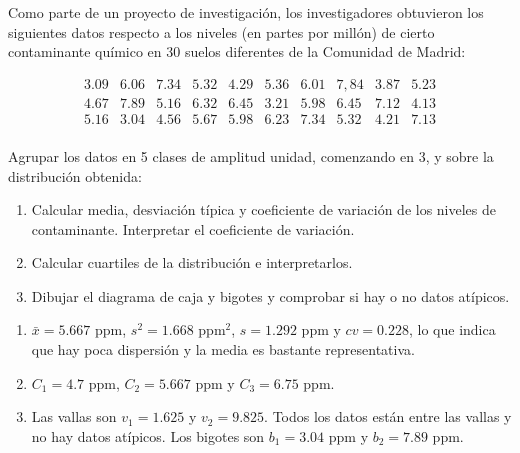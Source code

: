 {Como parte de un proyecto de investigación, los investigadores obtuvieron los siguientes datos respecto a los niveles (en partes por millón) de cierto contaminante químico en 30 suelos diferentes de la Comunidad de Madrid:
\begin{center}
\[
\begin{array}{cccccccccc}
3.09 & 6.06 & 7.34 & 5.32 & 4.29 & 5.36 & 6.01 & 7,84 & 3.87 & 5.23 \\
4.67 & 7.89 & 5.16 & 6.32 & 6.45 & 3.21 & 5.98 & 6.45 & 7.12 & 4.13 \\
5.16 & 3.04 & 4.56 & 5.67 & 5.98 & 6.23 & 7.34 & 5.32 & 4.21 & 7.13 \\
\end{array}
\]
\end{center}
Agrupar los datos en 5 clases de amplitud unidad, comenzando en 3, y sobre la distribución obtenida:
\begin{enumerate}
\item Calcular media, desviación típica y coeficiente de variación de los niveles de contaminante.
Interpretar el coeficiente de variación.
\item Calcular cuartiles de la distribución e interpretarlos.
\item Dibujar el diagrama de caja y bigotes y comprobar si hay o no datos atípicos.
\end{enumerate}
}
{\begin{enumerate}
\item $\bar x = 5.667$ ppm, $s^2= 1.668$ ppm$^2$, $s= 1.292$ ppm y $cv=0.228$, lo que indica que hay poca dispersión y la media es bastante representativa.
\item $C_1=4.7$ ppm, $C_2=5.667$ ppm y $C_3= 6.75$ ppm.
\item Las vallas son $v_1=1.625$ y $v_2=9.825$. Todos los datos están entre las vallas y no hay datos atípicos. Los bigotes son $b_1=3.04$ ppm y $b_2=7.89$ ppm.
\end{enumerate}
}
{}


